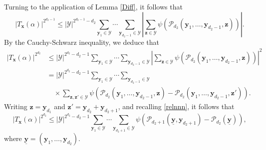 \documentclass[12pt, reqno]{amsart}
\numberwithin{equation}{section}
\newcommand{\0}{\mathbf{0}}
\renewcommand{\leq}{\leqslant}
\newcommand{\x}{\mathbf{x}}
\newcommand{\y}{\mathbf{y}}
\newcommand{\z}{\mathbf{z}}
\renewcommand{\=}{\equiv}
\newcommand{\1}{\mathbf{1}}
\theoremstyle{definition}
\begin{document}
Turning to the application of Lemma \ref{Diff}, 
it follows that  
\begin{equation} \label{beforeCS}
| T_{\x} ({\alpha}) |^{2^{d_2 - 1} }
\leq 
| \mathcal{Y} |^{2^{d_2-1} - d_2} \sum_{\y_1 \in \mathcal{Y}} \cdots
\sum_{\mathbf{y}_{d_2 - 1} \in \mathcal{Y}}
\left|  \sum_{\z \in \mathcal{Y} }
\psi ( \mathcal{P}_{d_2}(\mathbf{y}_1, \ldots, \mathbf{y}_{d_2 -1}, \z) ) \right|.
\end{equation}
By the Cauchy-Schwarz inequality, we deduce that
\begin{align*}
| T_{\mathbf{x}} ({\alpha}) |^{2^{d_2} }
&\leq  | \mathcal{Y} |^{2^{d_2} - d_2 - 1} \sum_{\mathbf{y}_1 \in \mathcal{Y}} \cdots
\sum_{\mathbf{y}_{d_2 - 1} \in \mathcal{Y}}
\left|  \sum_{\mathbf{z} \in \mathcal{Y}  }  \psi ( \mathcal{P}_{d_2}(\mathbf{y}_1, \ldots, \mathbf{y}_{d_2 - 1}, \mathbf{z}) ) \right|^2
\\
&=
| \mathcal{Y} |^{2^{d_2} - d_2 - 1} \sum_{\mathbf{y}_1 \in \mathcal{Y}} \cdots
\sum_{\mathbf{y}_{d_2 - 1} \in \mathcal{Y}}
\\
& \quad \times \sum_{\mathbf{z}, \mathbf{z}'   \in \mathcal{Y}  }
\psi ( \mathcal{P}_{d_2}(\mathbf{y}_1, \ldots, \mathbf{y}_{d_2 - 1}, \mathbf{z}) - \mathcal{P}_{d_2 }(\mathbf{y}_1, \ldots, \mathbf{y}_{d_2 - 1}, \mathbf{z}')  ).
\end{align*}
Writing $\z=\y_{d_1}$ and $\z'=\y_{d_2}+\y_{d_2+1}$, and 
recalling  \eqref{relnnn}, it follows that 
\begin{equation}\label{ineq 1-2}
| T_{\mathbf{x}} ({\alpha}) |^{2^{d_2} }\leq 
| \mathcal{Y} |^{2^{d_2 } - d_2 - 1 }
\sum_{\mathbf{y}_1 \in \mathcal{Y}}  \cdots
\sum_{\mathbf{y}_{d_2 + 1} \in \mathcal{Y} }  \psi( \mathcal{P}_{d_2 + 1}(\underline{\mathbf{y}}, \mathbf{y}_{d_2 + 1}) - \mathcal{P}_{d_2}(\underline{\mathbf{y}})
),
\end{equation}
where $\underline{\mathbf{y}} = (\mathbf{y}_1, \ldots, \mathbf{y}_{d_2})$.
\end{document}
